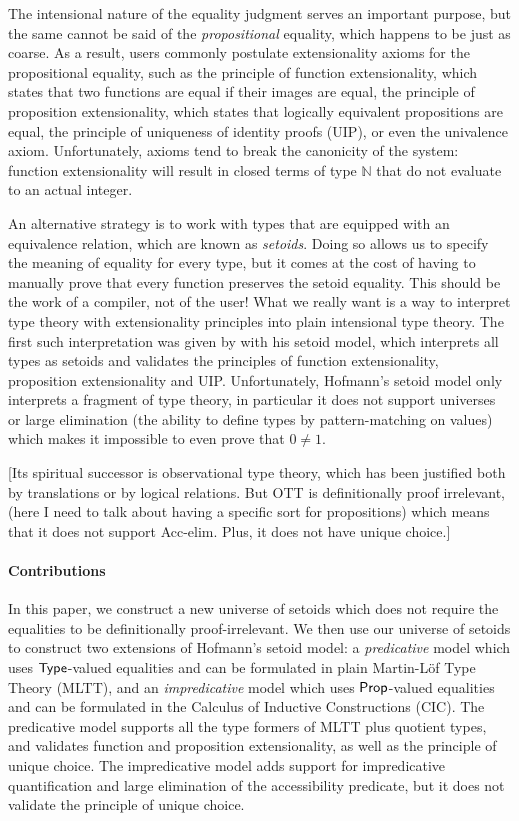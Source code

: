 \documentclass[acmsmall,screen,review]{acmart}
\begin{document}
The intensional nature of the equality judgment serves an important purpose,
but the same cannot be said of the \emph{propositional} equality,
which happens to be just as coarse.
%
As a result, users commonly postulate extensionality axioms for the
propositional equality, such as the principle of function
extensionality, which states that two functions are equal if their images are
equal, the principle of proposition extensionality, which states that
logically equivalent propositions are equal, the principle of uniqueness
of identity proofs (UIP), or even the univalence axiom.
%
Unfortunately, axioms tend to break the canonicity of the system: function
extensionality will result in closed terms of type \( \mathbb{N} \) that do not
evaluate to an actual integer.

An alternative strategy is to work with types that are equipped with an
equivalence relation, which are known as \emph{setoids}.
%
Doing so allows us to specify the meaning of equality for every type, but
it comes at the cost of having to manually prove that every function preserves
the setoid equality.
%
This should be the work of a compiler, not of the user!
%
What we really want is a way to interpret type theory with
extensionality principles into plain intensional type theory.
%
The first such interpretation was given by \citet{hofmann_setoids} with his setoid
model, which interprets all types as setoids and validates the principles of
function extensionality, proposition extensionality and UIP.
%
Unfortunately, Hofmann's setoid model only interprets a fragment of type theory,
in particular it does not support universes or large elimination (the ability to
define types by pattern-matching on values) which makes it impossible to even
prove that \( 0 \neq 1 \).
%

{\color{red} [Its spiritual successor is observational type theory, which has
been justified both by translations or by logical relations.
%
But OTT is definitionally proof irrelevant, (here I need to talk
about having a specific sort for propositions)
which means that it does not support Acc-elim.
Plus, it does not have unique choice.]}

\paragraph{Contributions}

In this paper, we construct a new universe of setoids which does not require the
equalities to be definitionally proof-irrelevant.
%
We then use our universe of setoids to construct two extensions of Hofmann's
setoid model:
%
a \emph{predicative} model which uses \( \mathsf{Type} \)-valued equalities and can be
formulated in plain Martin-Löf Type Theory (MLTT), and an \emph{impredicative}
model which uses \( \mathsf{Prop} \)-valued equalities and can be formulated in the
Calculus of Inductive Constructions (CIC).
%
The predicative model supports all the type formers of MLTT plus quotient
types, and validates function and proposition extensionality, as well as the
principle of unique choice.
%
The impredicative model adds support for impredicative quantification and
large elimination of the accessibility predicate, but it does not validate the
principle of unique choice.
\end{document}
